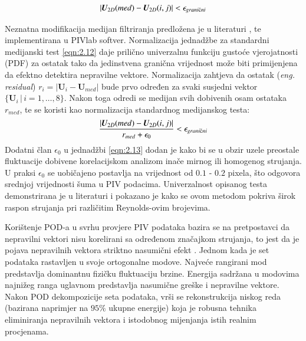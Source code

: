 \begin{description}[style=unboxed,leftmargin=0cm]
	\begin{equation}
		|\boldsymbol{U}_{2D}(med)-\boldsymbol{U}_{2D}(i,j)|<\epsilon_{grani\textup{č}ni}
		\label{eqn:2.12}
	\end{equation}
	\item[Normalizirani medijan test] Neznatna modifikacija medijan filtriranja predložena je u literaturi \cite{westerweel2005}, te implementirana u PIVlab softver. Normalizacija jednadžbe za standardni medijanski test \ref{eqn:2.12} daje prilično univerzalnu funkciju gustoće vjerojatnosti (PDF) za ostatak tako da jedinstvena granična vrijednost može biti primijenjena da efektno detektira nepravilne vektore. Normalizacija zahtjeva da ostatak (\textit{eng. residual}) $r_{i}=|\boldsymbol{U}_{i}-\boldsymbol{U}_{med}|$ bude prvo određen za svaki susjedni vektor $\{\boldsymbol{U}_{i}\, |\, i=1,\dots,8\}$. Nakon toga odredi se medijan svih dobivenih osam ostataka $r_{med}$, te se koristi kao normalizacija standardnog medijanskog testa:
	\begin{equation}
		\dfrac{|\boldsymbol{U}_{2D}(med)-\boldsymbol{U}_{2D}(i,j)|}{r_{med}+\epsilon_{0}}<\epsilon_{grani\textup{č}ni}
		\label{eqn:2.13}
	\end{equation}
	Dodatni član $\epsilon_{0}$ u jednadžbi \ref{eqn:2.13} dodan je kako bi se u obzir uzele preostale fluktuacije dobivene korelacijskom analizom inače mirnog ili homogenog strujanja. U praksi $\epsilon_{0}$ se uobičajeno postavlja na vrijednost od $0.1$ - $0.2$ pixela, što odgovora srednjoj vrijednosti šuma u PIV podacima. Univerzalnost opisanog testa demonstrirana je u literaturi \cite{westerweel2005} i pokazano je kako se ovom metodom pokriva širok raspon strujanja pri različitim Reynolds-ovim brojevima.
	\item[Provjera vektora brzina bazirana na pravilnoj ortogonalnoj dekompoziciji - POD] Korištenje POD-a  u svrhu provjere PIV podataka bazira se na pretpostavci da nepravilni vektori nisu korelirani sa određenom značajkom strujanja, to jest da je pojava nepravilnih vektora striktno nasumični efekt \cite{raffel2018_book}. Jednom kada je set podataka rastavljen u svoje ortogonalne modove. Najveće rangirani mod predstavlja dominantnu fizičku fluktuaciju brzine. Energija sadržana u modovima najnižeg ranga uglavnom predstavlja nasumične greške i nepravilne vektore. Nakon POD dekompozicije seta podataka, vrši se rekonstrukcija niskog reda (bazirana naprimjer na $95\%$ ukupne energije) koja je robusna tehnika eliminiranja nepravilnih vektora i istodobnog mijenjanja istih realnim procjenama.
\end{description}
